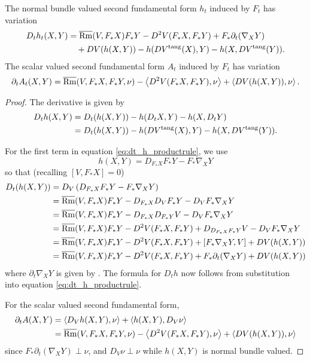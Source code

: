 \begin{lemma}
The normal bundle valued second fundamental form \(h_t\) induced by \(F_t\) has variation
\[
\begin{split}
D_t h_t (X, Y) &= \overline{\operatorname{Rm}} (V, F_{\ast} X) F_{\ast} Y - D^2 V(F_{\ast} X, F_{\ast} Y) + F_{\ast} \partial_t (\nabla_X Y) \\
&\quad + DV (h(X, Y)) - h(DV^{\operatorname{tang}}(X), Y) - h(X, DV^{\operatorname{tang}}(Y)).
\end{split}
\]
The scalar valued second fundamental form \(A_t\) induced by \(F_t\) has variation
\[
\partial_t A_t(X, Y) = \overline{\operatorname{Rm}} (V, F_{\ast} X, F_{\ast} Y, \nu) - \left\langle D^2 V(F_{\ast} X, F_{\ast} Y),\nu \right\rangle + \left\langle DV (h(X, Y)),\nu \right\rangle.
\]
\end{lemma}

\begin{proof}
The derivative is given by
\begin{equation}
\label{eq:dt_h_productrule}
\begin{split}
D_t h (X, Y) &= D_t (h(X, Y)) - h(D_t X, Y) - h(X, D_t Y) \\
&= D_t (h(X, Y)) - h(DV^{\operatorname{tang}}(X), Y) - h(X, DV^{\operatorname{tang}}(Y)).
\end{split}
\end{equation}

For the first term in equation \eqref{eq:dt_h_productrule}, we use
\[
h(X, Y) = D_{F_{\ast} X} F_{\ast} Y - F_{\ast} \nabla_X Y
\]
so that (recalling \([V, F_{\ast} X] = 0\))
\[
\begin{split}
D_t (h(X, Y)) &= D_V \left(D_{F_{\ast} X} F_{\ast} Y - F_{\ast} \nabla_X Y\right) \\
&= \overline{\operatorname{Rm}} (V, F_{\ast} X) F_{\ast} Y - D_{F_{\ast} X} D_V F_{\ast} Y - D_V F_{\ast} \nabla_X Y \\
&= \overline{\operatorname{Rm}} (V, F_{\ast} X) F_{\ast} Y - D_{F_{\ast} X} D_{F_{\ast} Y} V - D_V F_{\ast} \nabla_X Y \\
&= \overline{\operatorname{Rm}} (V, F_{\ast} X) F_{\ast} Y - D^2 V(F_{\ast} X, F_{\ast} Y) + D_{D_{F_{\ast} X} F_{\ast} Y} V - D_V F_{\ast} \nabla_X Y \\
&= \overline{\operatorname{Rm}} (V, F_{\ast} X) F_{\ast} Y - D^2 V(F_{\ast} X, F_{\ast} Y) + [F_{\ast} \nabla_X Y, V] + DV (h(X, Y)) \\
&= \overline{\operatorname{Rm}} (V, F_{\ast} X) F_{\ast} Y - D^2 V(F_{\ast} X, F_{\ast} Y) + F_{\ast} \partial_t (\nabla_X Y) + DV (h(X, Y))
\end{split}
\]
where \(\partial_t \nabla_X Y\) is given by . The formula for \(D_t h\) now follows from substitution into equation \eqref{eq:dt_h_productrule}.

For the scalar valued second fundamental form,
\[
\begin{split}
\partial_t A(X, Y) &= \left\langle D_V h(X, Y),\nu \right\rangle + \left\langle h(X, Y),D_V \nu \right\rangle \\
&= \overline{\operatorname{Rm}} (V, F_{\ast} X, F_{\ast} Y, \nu) - \left\langle D^2 V(F_{\ast} X, F_{\ast} Y),\nu \right\rangle + \left\langle DV (h(X, Y)),\nu \right\rangle
\end{split}
\]
since \(F_{\ast} \partial_t (\nabla_X Y) \perp \nu\), and \(D_V \nu \perp \nu\) while \(h(X, Y)\) is normal bundle valued.
\end{proof}
